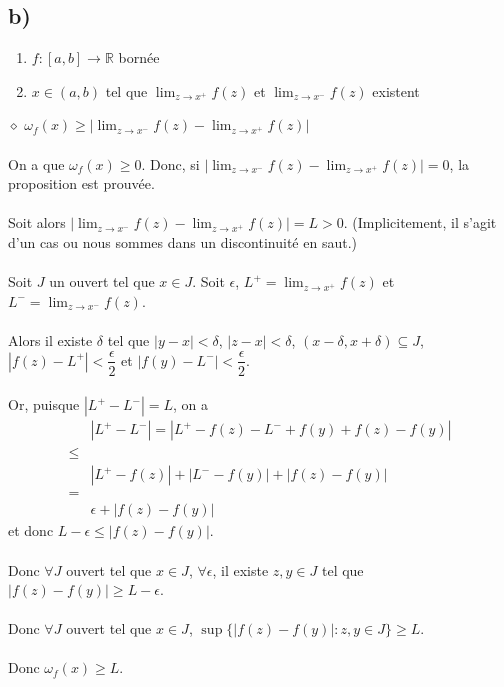 \documentclass[a4paper,10pt]{article}
\begin{document}
\subsection*{b)}
\begin{enumerate}
 \item $f : [a,b] \rightarrow \mathbb{R}$ bornée
 \item $x \in (a,b)$ tel que $\lim_{z\to x^+} f(z)$ et $\lim_{z \to x^-} f(z)$ existent
\end{enumerate}
$\diamond$ $\omega_f (x) \geq \left | \lim_{z \to x^-} f(z) - \lim_{z \to x^+} f(z) \right |$
\\
\\
On a que $\omega_f (x) \geq 0$. Donc, si $\left | \lim_{z \to x^-} f(z) - \lim_{z \to x^+} f(z) \right | = 0$, la proposition est prouvée.
\\
\\
Soit alors $\left | \lim_{z \to x^-} f(z) - \lim_{z \to x^+} f(z) \right | = L > 0$. (Implicitement, il s'agit d'un cas ou nous 
sommes dans un discontinuité en saut.)
\\
\\
Soit $J$ un ouvert tel que $x \in J$. Soit $\epsilon$, $L^+ = \lim_{z \to x^+} f(z)$ et $L^-  = \lim_{z \to x^-} f(z)$.
\\
\\
Alors il existe $\delta$ tel que $|y - x| < \delta$, $|z - x| < \delta$, $(x - \delta, x + \delta) \subseteq J$, 
$|f(z) - L^+| < \dfrac{\epsilon}{2}$ et $|f(y) - L^-| < \dfrac{\epsilon}{2}$.
\\
\\
Or, puisque $|L^+ - L^-| = L$, on a 
\begin{align*}
  & |L^+ - L^-| = |L^+ - f(z) - L^- + f(y) + f(z) - f(y)| \\
  \leq \\
  & |L^+ - f(z)| + |L^- - f(y)| + |f(z) - f(y)| \\
  = \\
  & \epsilon + |f(z) - f(y)|
\end{align*}
et donc $L - \epsilon \leq |f(z) - f(y)|$.
\\
\\
Donc $\forall J$ ouvert tel que $x \in J$, $\forall \epsilon$, il existe $z,y \in J$ tel que $|f(z) - f(y)| \geq L - \epsilon$.
\\
\\
Donc $\forall J$ ouvert tel que $x \in J$, $\sup \{|f(z) - f(y)| : z, y \in J \} \geq L$.
\\
\\
Donc $\omega_f (x) \geq L$.
\end{document}
